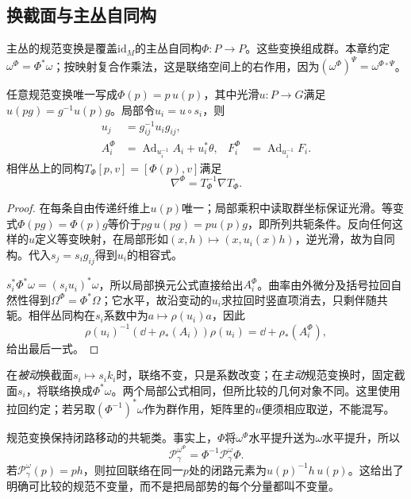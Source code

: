 \subsection{换截面与主丛自同构}
\begin{definition}
主丛的规范变换是覆盖$\mathrm{id}_M$的主丛自同构$\Phi:P\to P$。这些变换组成群。本章约定$\omega^\Phi=\Phi^*\omega$；按映射复合作乘法，这是联络空间上的右作用，因为$(\omega^\Phi)^\Psi=\omega^{\Phi\circ\Psi}$。
\end{definition}
\begin{proposition}\label{prop:principal-gauge}
任意规范变换唯一写成$\Phi(p)=p\,u(p)$，其中光滑$u:P\to G$满足$u(pg)=g^{-1}u(p)g$。局部令$u_i=u\circ s_i$，则
\begin{align}
 u_j&=g_{ij}^{-1}u_i g_{ij},\label{eq:principal-gauge-compatibility}\\
 A_i^\Phi&=\operatorname{Ad}_{u_i^{-1}}A_i+u_i^*\theta,
 & F_i^\Phi&=\operatorname{Ad}_{u_i^{-1}}F_i.\label{eq:principal-gauge-active}
\end{align}
相伴丛上的同构$T_\Phi[p,v]=[\Phi(p),v]$满足
\[
 \nabla^\Phi=T_\Phi^{-1}\nabla T_\Phi.
\]
\end{proposition}
\begin{proof}
在每条自由传递纤维上$u(p)$唯一；局部乘积中读取群坐标保证光滑。等变式$\Phi(pg)=\Phi(p)g$等价于$pg\,u(pg)=pu(p)g$，即所列共轭条件。反向任何这样的$u$定义等变映射，在局部形如$(x,h)\mapsto(x,u_i(x)h)$，逆光滑，故为自同构。代入$s_j=s_i g_{ij}$得到$u_i$的相容式。

$s_i^*\Phi^*\omega=(s_i u_i)^*\omega$，所以局部换元公式直接给出$A_i^\Phi$。曲率由外微分及括号拉回自然性得到$\Omega^\Phi=\Phi^*\Omega$；它水平，故沿变动的$u_i$求拉回时竖直项消去，只剩伴随共轭。相伴丛同构在$s_i$系数中为$a\mapsto\rho(u_i)a$，因此
\[
 \rho(u_i)^{-1}(\dd+\rho_*(A_i))\rho(u_i)
 =\dd+\rho_*(A_i^\Phi),
\]
给出最后一式。
\end{proof}
在\emph{被动}换截面$s_i\mapsto s_i k_i$时，联络不变，只是系数改变；在\emph{主动}规范变换时，固定截面$s_i$，将联络换成$\Phi^*\omega$。两个局部公式相同，但所比较的几何对象不同。这里使用拉回约定；若另取$(\Phi^{-1})^*\omega$作为群作用，矩阵里的$u$便须相应取逆，不能混写。

规范变换保持闭路移动的共轭类。事实上，$\Phi$将$\omega^\Phi$水平提升送为$\omega$水平提升，所以
\[
 \mathcal P_\gamma^{\omega^\Phi}=\Phi^{-1}\mathcal P_\gamma^\omega\Phi.
\]
若$\mathcal P_\gamma^\omega(p)=ph$，则拉回联络在同一$p$处的闭路元素为$u(p)^{-1}h\,u(p)$。这给出了明确可比较的规范不变量，而不是把局部势的每个分量都叫不变量。
